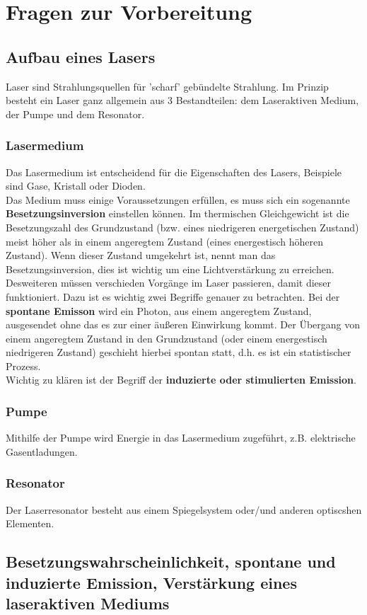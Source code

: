 \chapter{Fragen zur Vorbereitung}
\section{Aufbau eines Lasers}
Laser sind Strahlungsquellen für 'scharf' gebündelte Strahlung. 
Im Prinzip besteht ein Laser ganz allgemein aus 3 Bestandteilen: 
dem Laseraktiven Medium, der Pumpe und dem Resonator.
\subsection{Lasermedium}
Das Lasermedium ist entscheidend für die Eigenschaften des Lasers, Beispiele 
sind Gase, Kristall oder Dioden.\\
Das Medium muss einige Voraussetzungen erfüllen, es muss sich 
ein sogenannte \textbf{Besetzungsinversion} einstellen können. 
Im thermischen Gleichgewicht ist die Besetzungszahl des Grundzustand 
(bzw. eines niedrigeren energetischen Zustand) meist höher als in 
einem angeregtem Zustand (eines energestisch höheren Zustand). 
Wenn dieser Zustand umgekehrt ist, nennt man das Besetzungsinversion, dies ist 
wichtig um eine Lichtverstärkung zu erreichen.\\
Desweiteren müssen verschieden Vorgänge im Laser passieren, damit dieser funktioniert.
Dazu ist es wichtig zwei Begriffe genauer zu betrachten. 
Bei der \textbf{spontane Emisson} wird ein Photon, aus einem angeregtem Zustand, 
ausgesendet ohne das es zur einer äußeren Einwirkung kommt. Der Übergang von einem angeregtem
Zustand in den Grundzustand (oder einem energestisch niedrigeren Zustand) geschieht hierbei spontan statt, d.h. es ist
ein statistischer Prozess.\\
Wichtig zu klären ist der Begriff der \textbf{induzierte oder stimulierten Emission}.
\subsection{Pumpe}
Mithilfe der Pumpe wird Energie in das Lasermedium zugeführt, z.B. elektrische 
Gasentladungen.
\subsection{Resonator}
Der Laserresonator besteht aus einem Spiegelsystem oder/und anderen optiscshen Elementen.
\section{Besetzungswahrscheinlichkeit, spontane und induzierte Emission, Verstärkung 
eines laseraktiven Mediums}
